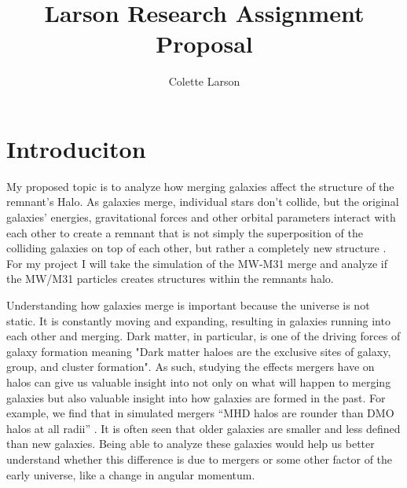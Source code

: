 \documentclass[linenumbers,trackchanges]{aastex7}
\begin{document}
\title{Larson Research Assignment Proposal}

\author[orcid=0000-0000-0000-0001,sname='Larson']{Colette Larson}

\section{Introduciton}
My proposed topic is to analyze how merging galaxies affect the structure of the remnant’s Halo. As galaxies merge, individual stars don't collide, but the original galaxies’ energies, gravitational forces and other orbital parameters interact with each other to create a remnant that is not simply the superposition of the colliding galaxies on top of each other, but rather a completely new structure \cite{10.1093/mnras/stz1306}. For my project I will take the simulation of the MW-M31 merge and analyze if the MW/M31 particles creates  structures within the remnants halo.

Understanding how galaxies merge is important because the universe is not static. It is constantly moving and expanding, resulting in galaxies running into each other and merging. Dark matter, in particular, is one of the driving forces of galaxy formation meaning "Dark matter haloes are the exclusive sites of galaxy, group, and cluster formation"\cite{10.1093/mnras/stz1306}. As such, studying the effects mergers have on halos  can give us valuable insight into not only on what will happen to merging galaxies but also valuable insight into how  galaxies are formed in the past. For example, we find that in simulated mergers “MHD halos are rounder than DMO halos at all radii” \cite{10.1093/mnras/stz2873}. It is often seen that older galaxies are smaller and less defined than new galaxies. Being able to analyze these galaxies would help us better understand whether this difference is due to mergers or some other factor of the early universe, like a change in angular momentum. 
\end{document}
